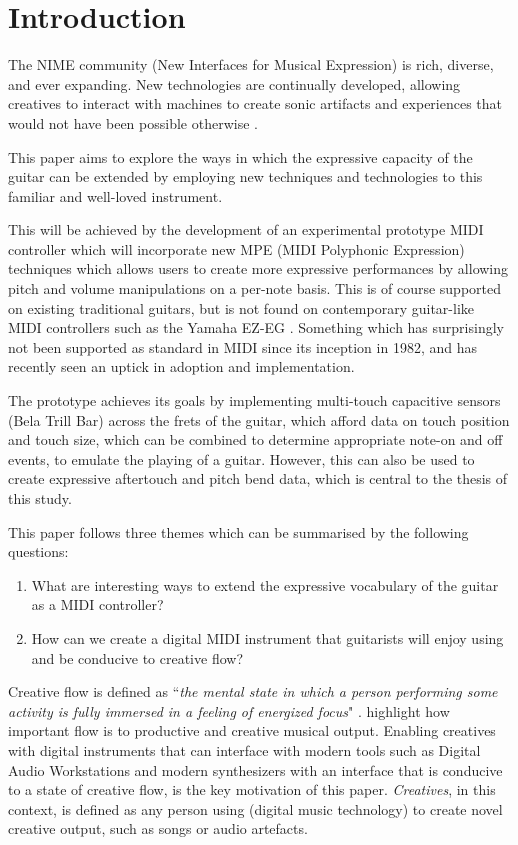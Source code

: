 
\section{Introduction}

The NIME community (New Interfaces for Musical Expression) is rich, diverse, and ever expanding. New technologies are continually developed, allowing creatives to interact with machines to create sonic artifacts and experiences that would not have been possible otherwise \citep{wanderley_gestural_2001}. 

This paper aims to explore the ways in which the expressive capacity of the guitar can be extended by employing new techniques and technologies to this familiar and well-loved instrument.

This will be achieved by the development of an experimental prototype MIDI controller which will incorporate new MPE (MIDI Polyphonic Expression) techniques which allows users to create more expressive performances by allowing pitch and volume manipulations on a per-note basis. This is of course supported on existing traditional guitars, but is not found on contemporary guitar-like MIDI controllers such as the Yamaha EZ-EG \citep{yamaha_yamaha_2003}. Something which has surprisingly not been supported as standard in MIDI since its inception in 1982, and has recently seen an uptick in adoption and implementation.

The prototype achieves its goals by implementing multi-touch capacitive sensors (Bela Trill Bar) across the frets of the guitar, which afford data on touch position and touch size, which can be combined to determine appropriate note-on and off events, to emulate the playing of a guitar. However, this can also be used to create expressive aftertouch and pitch bend data, which is central to the thesis of this study. 

This paper follows three themes which can be summarised by the following questions:
\begin{enumerate}
    \item What are interesting ways to extend the expressive vocabulary of the guitar as a MIDI controller?
    \item How can we create a digital MIDI instrument that guitarists will enjoy using and be conducive to creative flow?
\end{enumerate}

Creative flow is defined as ``\textit{the mental state in which a person performing some activity is fully immersed in a feeling of energized focus}" \citep{csikszentmihalyi_flow_1990}. \cite{macdonald_creativity_2006} highlight how important flow is to productive and creative musical output. Enabling creatives with digital instruments that can interface with modern tools such as Digital Audio Workstations and modern synthesizers with an interface that is conducive to a state of creative flow, is the key motivation of this paper. \textit{Creatives}, in this context, is defined as any person using (digital music technology) to create novel creative output, such as songs or audio artefacts. 

